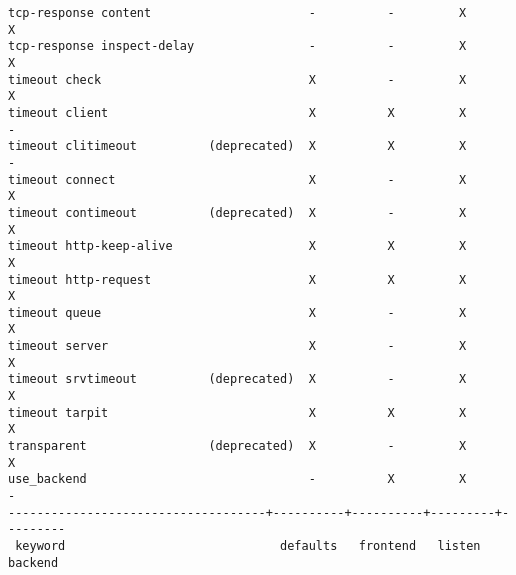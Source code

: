 \begin{verbatim}
tcp-response content                      -          -         X         X
tcp-response inspect-delay                -          -         X         X
timeout check                             X          -         X         X
timeout client                            X          X         X         -
timeout clitimeout          (deprecated)  X          X         X         -
timeout connect                           X          -         X         X
timeout contimeout          (deprecated)  X          -         X         X
timeout http-keep-alive                   X          X         X         X
timeout http-request                      X          X         X         X
timeout queue                             X          -         X         X
timeout server                            X          -         X         X
timeout srvtimeout          (deprecated)  X          -         X         X
timeout tarpit                            X          X         X         X
transparent                 (deprecated)  X          -         X         X
use_backend                               -          X         X         -
------------------------------------+----------+----------+---------+---------
 keyword                              defaults   frontend   listen    backend


\end{verbatim}
